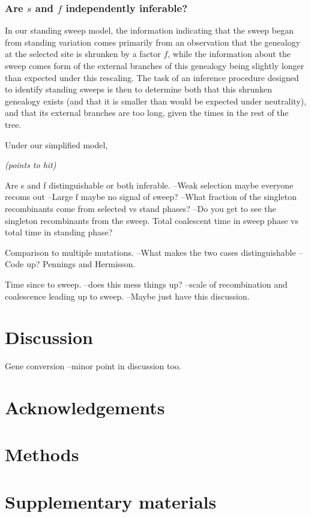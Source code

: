 \documentclass[a4paper,10pt]{article}
\newcommand{\gc}[1]{{\it \color{red} (#1)} }
\begin{document}
\subsubsection{Are $s$ and $f$ independently inferable?}

In our standing sweep model, the information indicating that the sweep began from standing variation comes primarily from an observation that the genealogy at the selected site is shrunken by a factor $f$, while the information about the sweep comes form of the external branches of this genealogy being slightly longer than expected under this rescaling. The task of an inference procedure designed to identify standing sweeps is then to determine both that this shrunken genealogy exists (and that it is smaller than would be expected under neutrality), and that its external branches are too long, given the times in the rest of the tree.

Under our simplified model, 

\gc{points to hit}

Are s and f distinguishable or both inferable.
--Weak selection maybe everyone recoms out
--Large f maybe no signal of sweep?
--What fraction of the singleton recombinants come from selected vs stand phases?
--Do you get to see the singleton recombinants from the sweep. Total coalescent time in sweep phase vs total time in standing phase?

Comparison to multiple mutations. 
--What makes the two cases distinguishable
--Code up? Pennings and Hermisson.


Time since to sweep. 
--does this mess things up?
--scale of recombination and coalescence leading up to sweep.
--Maybe just have this discussion.


\section{Discussion}

Gene conversion --minor point in discussion too. 


\section{Acknowledgements}

\section{Methods}





\section{Supplementary materials}

\setcounter{table}{0}
\renewcommand{\thetable}{S\arabic{table}}
\setcounter{figure}{0}
\renewcommand{\thefigure}{S\arabic{figure}}
\end{document}
